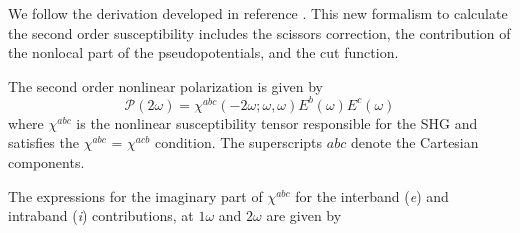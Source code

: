 \documentclass[pss]{wiley2sp} %
\begin{document}
We follow the derivation developed in reference \cite{andersonPRB15}. This new formalism to calculate the second order susceptibility includes the scissors correction, the contribution of the nonlocal part of the pseudopotentials, and the cut function. 

The second order nonlinear polarization is given by 
\begin{equation*}
\mathcal{P}(2\omega) = \chi^{abc}(-2\omega;\omega,\omega)E^{b}(\omega)E^{c}(\omega)
\end{equation*}
where $\chi^{abc}$ is the nonlinear susceptibility tensor responsible for the SHG and satisfies the $\chi^{abc}$ = $\chi^{acb}$ condition. The superscripts $abc$ denote the Cartesian components.  

The expressions for the imaginary part of $\chi^{abc}$ for the interband (\emph{e}) and intraband (\emph{i}) contributions, at $1\omega$ and $2\omega$ are given by
\end{document}

